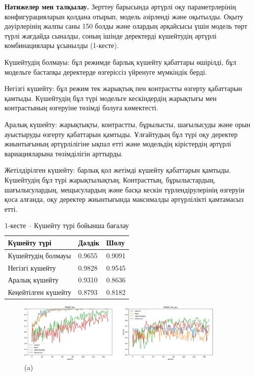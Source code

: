 \begin{multicols}{2}
\hspace{0pt} {\bfseries Нәтижелер мен талқылау.} Зерттеу барысында әртүрлі
оқу параметрлерінің конфигурацияларын қолдана отырып, модель әзірленді
және оқытылды. Оқыту дәуірлерінің жалпы саны 150 болды және олардың
әрқайсысы үшін модель төрт түрлі жағдайда сыналды, соның ішінде
деректерді күшейтудің әртүрлі комбинациялары ұсынылды (1-кесте).

Күшейтудің болмауы: бұл режимде барлық күшейту қабаттары өшірілді, бұл
модельге бастапқы деректерде өзгеріссіз үйренуге мүмкіндік берді.

Негізгі күшейту: бұл режим тек жарықтық пен контрастты өзгерту
қабаттарын қамтыды. Күшейтудің бұл түрі модельге кескіндердің жарықтығы
мен контрастының өзгеруіне төзімді болуға көмектесті.

Аралық күшейту: жарықтықты, контрастты, бұрылысты, шағылысуды және орын
ауыстыруды өзгерту қабаттарын қамтыды. Ұлғайтудың бұл түрі оқу деректер
жиынтығының әртүрлілігіне ықпал етті және модельдің кірістердің әртүрлі
вариацияларына төзімділігін арттырды.

Жетілдірілген күшейту: барлық қол жетімді күшейту қабаттарын қамтыды.
Күшейтудің бұл түрі жарықтылықтың, Контрасттың, бұрылыстардың,
шағылысулардың, мещысулардың және басқа кескін түрлендірулерінің
өзгеруін қоса алғанда, оқу деректер жиынтығында максималды әртүрлілікті
қамтамасыз етті.
\end{multicols}

\begin{table}[]
\caption*{1-кесте -- Күшейту түрі бойынша бағалау}
\centering
\begin{tabular}{|l|l|l|}
\hline
Күшейту түрі & Дәлдік & Шолу \\ \hline
Күшейтудің болмауы & 0.9655 & 0.9091 \\ \hline
Негізгі күшейту & 0.9828 & 0.9545 \\ \hline
Аралық күшейту & 0.9310 & 0.8636 \\ \hline
Кеңейтілген күшейту & 0.8793 & 0.8182 \\ \hline
\end{tabular}%
\end{table}

\begin{figure}[H]
	\centering
	\includegraphics[width=0.9\textwidth]{assets/4}
	\caption*{(a)}
\end{figure}

